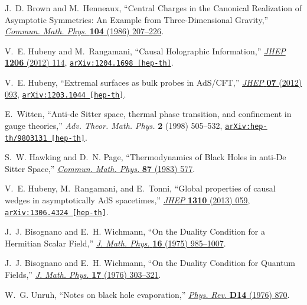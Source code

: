 \begin{thebibliography}{100}
J.~D. Brown and M.~Henneaux, ``{Central Charges in the Canonical Realization of
  Asymptotic Symmetries: An Example from Three-Dimensional Gravity},''
\href{http://dx.doi.org/10.1007/BF01211590}{{\em Commun. Math. Phys.} {\bf 104}
  (1986)  207--226}.

V.~E. Hubeny and M.~Rangamani, ``{Causal Holographic Information},''
  \href{http://dx.doi.org/10.1007/JHEP06(2012)114}{{\em JHEP} {\bf 1206} (2012)
   114},
\href{http://arxiv.org/abs/1204.1698}{{\tt arXiv:1204.1698 [hep-th]}}.

V.~E. Hubeny, ``{Extremal surfaces as bulk probes in AdS/CFT},''
  \href{http://dx.doi.org/10.1007/JHEP07(2012)093}{{\em JHEP} {\bf 07} (2012)
  093},
\href{http://arxiv.org/abs/1203.1044}{{\tt arXiv:1203.1044 [hep-th]}}.

E.~Witten, ``{Anti-de Sitter space, thermal phase transition, and confinement
  in gauge theories},'' {\em Adv. Theor. Math. Phys.} {\bf 2} (1998)  505--532,
\href{http://arxiv.org/abs/hep-th/9803131}{{\tt arXiv:hep-th/9803131
  [hep-th]}}.

S.~W. Hawking and D.~N. Page, ``{Thermodynamics of Black Holes in anti-De
  Sitter Space},''
\href{http://dx.doi.org/10.1007/BF01208266}{{\em Commun. Math. Phys.} {\bf 87}
  (1983)  577}.

V.~E. Hubeny, M.~Rangamani, and E.~Tonni, ``{Global properties of causal wedges
  in asymptotically AdS spacetimes},''
  \href{http://dx.doi.org/10.1007/JHEP10(2013)059}{{\em JHEP} {\bf 1310} (2013)
   059},
\href{http://arxiv.org/abs/1306.4324}{{\tt arXiv:1306.4324 [hep-th]}}.

J.~J. Bisognano and E.~H. Wichmann, ``{On the Duality Condition for a Hermitian
  Scalar Field},''
\href{http://dx.doi.org/10.1063/1.522605}{{\em J. Math. Phys.} {\bf 16} (1975)
  985--1007}.

J.~J. Bisognano and E.~H. Wichmann, ``{On the Duality Condition for Quantum
  Fields},''
\href{http://dx.doi.org/10.1063/1.522898}{{\em J. Math. Phys.} {\bf 17} (1976)
  303--321}.

W.~G. Unruh, ``{Notes on black hole evaporation},''
\href{http://dx.doi.org/10.1103/PhysRevD.14.870}{{\em Phys. Rev.} {\bf D14}
  (1976)  870}.


\end{thebibliography}
